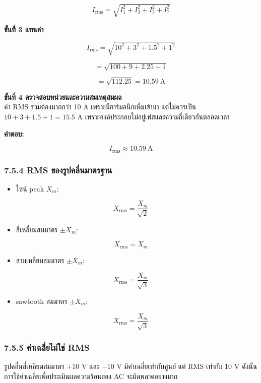 \[
I_{\mathrm{rms}}=\sqrt{I_1^2+I_3^2+I_5^2+I_7^2}
\]

\textbf{ขั้นที่ 3 แทนค่า}

\[
I_{\mathrm{rms}}=\sqrt{10^2+3^2+1.5^2+1^2}
\]

\[
=\sqrt{100+9+2.25+1}
\]

\[
=\sqrt{112.25}=10.59\ \text{A}
\]

\textbf{ขั้นที่ 4 ตรวจสอบหน่วยและความสมเหตุสมผล} \\
ค่า RMS รวมต้องมากกว่า 10 A เพราะมีฮาร์มอนิกเพิ่มเข้ามา แต่ไม่ควรเป็น $10+3+1.5+1=15.5$ A เพราะองค์ประกอบไม่อยู่เฟสและความถี่เดียวกันตลอดเวลา

\textbf{คำตอบ:}

\[
\boxed{I_{\mathrm{rms}}\approx10.59\ \text{A}}
\]

\subsubsection{7.5.4 RMS ของรูปคลื่นมาตรฐาน}

\begin{itemize}
    \item ไซน์ peak $X_m$:
\end{itemize}

\[
X_{\mathrm{rms}}=\frac{X_m}{\sqrt{2}}
\]

\begin{itemize}
    \item สี่เหลี่ยมสมมาตร $\pm X_m$:
\end{itemize}

\[
X_{\mathrm{rms}}=X_m
\]

\begin{itemize}
    \item สามเหลี่ยมสมมาตร $\pm X_m$:
\end{itemize}

\[
X_{\mathrm{rms}}=\frac{X_m}{\sqrt{3}}
\]

\begin{itemize}
    \item sawtooth สมมาตร $\pm X_m$:
\end{itemize}

\[
X_{\mathrm{rms}}=\frac{X_m}{\sqrt{3}}
\]

\subsubsection{7.5.5 ค่าเฉลี่ยไม่ใช่ RMS}

รูปคลื่นสี่เหลี่ยมสมมาตร $+10$ V และ $-10$ V มีค่าเฉลี่ยเท่ากับศูนย์ แต่ RMS เท่ากับ 10 V ดังนั้นการใช้ค่าเฉลี่ยเพื่อประเมินผลความร้อนของ AC จะผิดพลาดอย่างมาก



